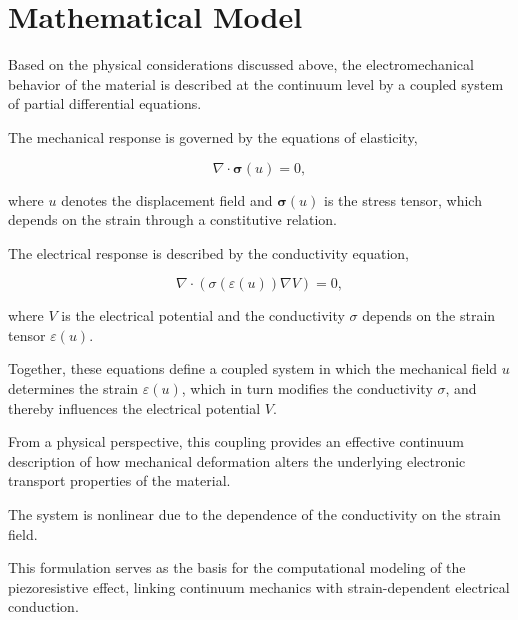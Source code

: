 \section{Mathematical Model}
\label{sec:math model}

Based on the physical considerations discussed above, the electromechanical behavior 
of the material is described at the continuum level by a coupled system of partial differential equations.

The mechanical response is governed by the equations of elasticity,

\begin{equation}
    \label{eq:conductivity}
    \nabla \cdot \boldsymbol{\sigma}(u) = 0,
\end{equation}

where $u$ denotes the displacement field and $\boldsymbol{\sigma}(u)$ is the stress tensor, 
which depends on the strain through a constitutive relation.

The electrical response is described by the conductivity equation,

\begin{equation}
    \label{eq:1d-cond}
    \nabla \cdot \left( \sigma(\varepsilon(u)) \nabla V \right) = 0,
\end{equation}

where $V$ is the electrical potential and the conductivity $\sigma$ depends on the strain tensor 
$\varepsilon(u)$.

Together, these equations define a coupled system in which the mechanical field $u$ determines 
the strain $\varepsilon(u)$, which in turn modifies the conductivity $\sigma$, and thereby 
influences the electrical potential $V$.

From a physical perspective, this coupling provides an effective continuum description of how 
mechanical deformation alters the underlying electronic transport properties of the material.

The system is nonlinear due to the dependence of the conductivity on the strain field.

This formulation serves as the basis for the computational modeling of the piezoresistive effect, 
linking continuum mechanics with strain-dependent electrical conduction.
